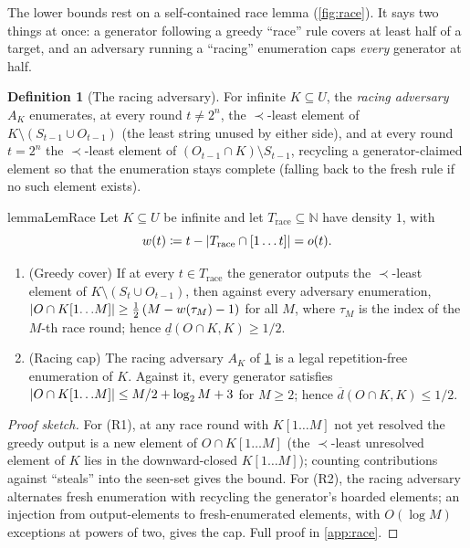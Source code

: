 \documentclass[11pt]{article}
\numberwithin{equation}{section}
\newcommand{\N}{\mathbb{N}}
\newcommand{\defeq}{\coloneqq}
\DeclarePairedDelimiter{\abs}{\lvert}{\rvert}
\newcommand{\gnd}{U}
\newcommand{\Seen}{S}
\newcommand{\Out}{O}
\newcommand{\dlow}[2]{\underline{d}(#1,#2)}
\newcommand{\dup}[2]{\overline{d}(#1,#2)}
\newcommand{\rest}[2]{#1[1\!\dots\! #2]}
\theoremstyle{plain}
\theoremstyle{definition}
\newtheorem{definition}[theorem]{Definition}
\theoremstyle{remark}
\begin{document}
The lower bounds rest on a self-contained race lemma (\cref{fig:race}). It says two things at
once: a generator following a greedy ``race'' rule covers at least half of a target, and an
adversary running a ``racing'' enumeration caps \emph{every} generator at half.


\begin{definition}[The racing adversary]\label{def:racingadv}
For infinite $K \subseteq \gnd$, the \emph{racing adversary} $A_K$ enumerates, at every round
$t \ne 2^n$, the $\prec$-least element of $K \setminus (\Seen_{t-1} \cup \Out_{t-1})$ (the
least string unused by either side), and at every round $t = 2^n$ the $\prec$-least element of
$(\Out_{t-1} \cap K) \setminus \Seen_{t-1}$, recycling a generator-claimed element so that the
enumeration stays complete (falling back to the fresh rule if no such element exists).
\end{definition}

\begin{restatable}{lemma}{LemRace}\label{lem:race}
Let $K \subseteq \gnd$ be infinite and let $T_{\mathrm{race}} \subseteq \N$ have density
$1$, with $$w(t) \defeq t - \abs{T_{\mathrm{race}} \cap [1\dots t]} = o(t).$$
\begin{enumerate}[label=\textup{(R\arabic*)}]
  \item \textup{(Greedy cover)} If at every $t \in T_{\mathrm{race}}$ the generator outputs
    the $\prec$-least element of $K \setminus (\Seen_t \cup \Out_{t-1})$, then against every
    adversary enumeration, $\abs{\Out \cap \rest{K}{M}} \ge \tfrac12\,(M - w(\tau_M) - 1)$ for
    all $M$, where $\tau_M$ is the index of the $M$-th race round; hence $\dlow{\Out \cap
    K}{K} \ge 1/2$.
  \item \textup{(Racing cap)} The racing adversary $A_K$ of \cref{def:racingadv} is a legal
    repetition-free enumeration of $K$. Against it, every generator satisfies $\abs{\Out \cap
    \rest{K}{M}} \le M/2 + \log_2 M + 3$ for $M \ge 2$; hence $\dup{\Out \cap K}{K} \le 1/2$.
\end{enumerate}
\end{restatable}

\begin{proof}[Proof sketch]
For (R1), at any race round with $\rest{K}{M}$ not yet resolved the greedy output is a new
element of $\Out \cap \rest{K}{M}$ (the $\prec$-least unresolved element of $K$ lies in the
downward-closed $\rest{K}{M}$); counting contributions against ``steals'' into the seen-set
gives the bound. For (R2), the racing adversary alternates fresh enumeration with recycling
the generator's hoarded elements; an injection from output-elements to fresh-enumerated
elements, with $O(\log M)$ exceptions at powers of two, gives the cap. Full proof in
\cref{app:race}.
\end{proof}
\end{document}
